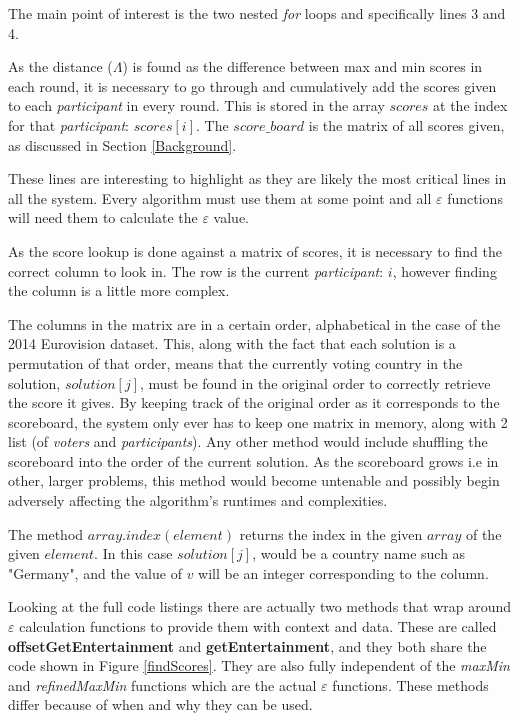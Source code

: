 \documentclass[12pt]{report}
\begin{document}
The main point of interest is the two nested \textit{for} loops and specifically lines 3 and 4.

As the distance ($\Lambda$) is found as the difference between max and min scores in each round, it is necessary to go through and cumulatively add the scores given to each \textit{participant} in every round. This is stored in the array $scores$ at the index for that \textit{participant}: $scores[i]$. The $score\_board$ is the matrix of all scores given, as discussed in Section \ref{Background}. 

These lines are interesting to highlight as they are likely the most critical lines in all the system. Every algorithm must use them at some point and all $\varepsilon$ functions will need them to calculate the $\varepsilon$ value.

As the score lookup is done against a matrix of scores, it is necessary to find the correct column to look in. The row is the current \textit{participant}: $i$, however finding the column is a little more complex. 

The columns in the matrix are in a certain order, alphabetical in the case of the 2014 Eurovision dataset. This, along with the fact that each solution is a permutation of that order, means that the currently voting country in the solution, $solution[j]$, must be found in the original order to correctly retrieve the score it gives. By keeping track of the original order as it corresponds to the scoreboard, the system only ever has to keep one matrix in memory, along with 2 list (of \textit{voters} and \textit{participants}). Any other method would include shuffling the scoreboard into the order of the current solution. As the scoreboard grows i.e in other, larger problems, this method would become untenable and possibly begin adversely affecting the algorithm's runtimes and complexities.

The method $array.index(element)$ returns the index in the given $array$ of the given $element$. In this case $solution[j]$, would be a country name such as "Germany", and the value of $v$ will be an integer corresponding to the column.

Looking at the full code listings there are actually two methods that wrap around $\varepsilon$ calculation functions to provide them with context and data. These are called \textbf{offsetGetEntertainment} and \textbf{getEntertainment}, and they both share the code shown in Figure \ref{findScores}. They are also fully independent of the \textit{maxMin} and \textit{refinedMaxMin} functions which are the actual $\varepsilon$ functions. These methods differ because of when and why they can be used.
\end{document}
